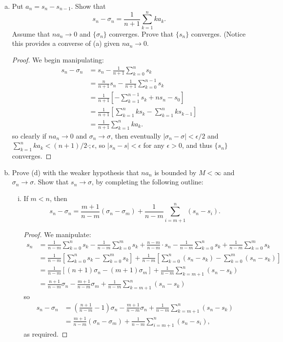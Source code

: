 \begin{enumerate}
\begin{enumerate}[(a)]
\item Put $a_n = s_n - s_{n-1}$. Show that
\[
    s_n - \sigma_n = \frac{1}{n + 1} \sum_{k=1}^{n} ka_k.
\]
Assume that $na_n \to 0$ and $\{\sigma_n\}$ converges. Prove that $\{s_n\}$ converges. (Notice this provides a converse of (a) given $na_n \to 0$.

\begin{proof}
    We begin manipulating:
    \begin{align*}
        s_n - \sigma_n &= s_n - \frac{1}{n + 1} \sum_{k=0}^{n} s_k \\
            &= \frac{n}{n + 1} s_n - \frac{1}{n + 1} \sum_{k=0}^{n - 1} s_k \\
            &= \frac{1}{n + 1} \left[-\sum_{k=1}^{n-1} s_k + ns_n - s_0 \right] \\
            &= \frac{1}{n + 1} \left[ \sum_{k=1}^{n} ks_k - \sum_{k=1}^{n}ks_{k-1}\right] \\
            &= \frac{1}{n + 1} \sum_{k=1}^{n} ka_k.
    \end{align*}
    so clearly if $na_n \to 0$ and $\sigma_n \to \sigma$, then eventually $|\sigma_n - \sigma| < \epsilon/2$ and $\sum_{k=1}^{n} ka_k < (n+1)/2 \cdot ;\epsilon$, so $|s_n - s| < \epsilon$ for any $\epsilon > 0$, and thus $\{s_n\}$ converges.
\end{proof}

\item Prove (d) with the weaker hypothesis that $na_n$ is bounded by $M < \infty$ and $\sigma_n \to \sigma$. Show that $s_n \to \sigma$, by completing the following outline:
\begin{enumerate}[(i)]
\item If $m < n$, then
\[
	s_n - \sigma_n = \frac{m+1}{n-m}(\sigma_n - \sigma_m) + \frac{1}{n-m}\sum_{i=m+1}^{n} (s_n - s_i).
\]

\begin{proof}
    We manipulate:
    \begin{align*}
        s_n &= \frac{1}{n-m} \sum_{k=0}^{n} s_k - \frac{1}{n-m}\sum_{k=0}^{m} s_k + \frac{n-m}{n-m} \cdot s_n - \frac{1}{n-m} \sum_{k=0}^{n} s_k + \frac{1}{n-m} \sum_{k=0}^{m} s_k \\
            &= \frac{1}{n-m} \left[ \sum_{k=0}^{n} s_k - \sum_{k=0}^{m} s_k \right] + \frac{1}{n-m} \left[ \sum_{k=0}^{n} (s_n - s_k) - \sum_{k=0}^{m}(s_n - s_k) \right] \\
            &= \frac{1}{n-m} \left[ (n+1)\sigma_n - (m+1)\sigma_m \right] + \frac{1}{n-m} \sum_{k=m+1}^{n} (s_n - s_k) \\
            &= \frac{n+1}{n-m} \sigma_n - \frac{m+1}{n-m} \sigma_m + \frac{1}{n-m} \sum_{k=m+1}^{n} (s_n - s_k)
    \end{align*}
    so
    \begin{align*}
        s_n - \sigma_n &= \left( \frac{n+1}{n-m} - 1 \right) \sigma_n - \frac{m+1}{n-m} \sigma_n + \frac{1}{n-m} \sum_{k=m+1}^{n} (s_n - s_k) \\
            &= \frac{m+1}{n-m}(\sigma_n - \sigma_m) + \frac{1}{n-m} \sum_{i=m+1}^{n} (s_n - s_i),
    \end{align*}
    as required.
\end{proof}


\end{enumerate}
\end{enumerate}
\end{enumerate}

